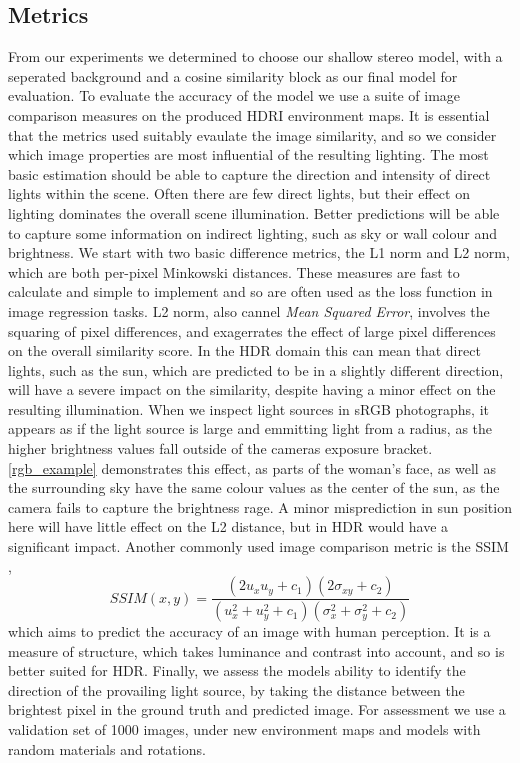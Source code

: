 \documentclass[ %
                    author={Gavin Parker},
                supervisor={Dr. Neill Campbell},
                    degree={MEng},
                     title={Deep Siamese Networks for Illumination Estimation from Stereo Images},
                  subtitle={},
                      type={Research},
                      year={2018} ]{dissertation}
\begin{document}
\subsection{Metrics}
From our experiments we determined to choose our shallow stereo model, with a seperated background and a cosine similarity block as our final model for evaluation. To evaluate the accuracy of the model we use a suite of image comparison measures on the produced HDRI environment maps. It is essential that the metrics used suitably evaulate the image similarity, and so we consider which image properties are most influential of the resulting lighting. The most basic estimation should be able to capture the direction and intensity of direct lights within the scene. Often there are few direct lights, but their effect on lighting dominates the overall scene illumination. Better predictions will be able to capture some information on indirect lighting, such as sky or wall colour and brightness.
\newline 
We start with two basic difference metrics, the L1 norm and L2 norm, which are both per-pixel Minkowski distances. These measures are fast to calculate and simple to implement and so are often used as the loss function in image regression tasks. L2 norm, also cannel \textit{Mean Squared Error}, involves the squaring of pixel differences, and exagerrates the effect of large pixel differences on the overall similarity score. In the HDR domain this can mean that direct lights, such as the sun, which are predicted to be in a slightly different direction, will have a severe impact on the similarity, despite having a minor effect on the resulting illumination. When we inspect light sources in sRGB photographs, it appears as if the light source is large and emmitting light from a radius, as the higher brightness values fall outside of the cameras exposure bracket. \ref{rgb_example} demonstrates this effect, as parts of the woman's face, as well as the surrounding sky have the same colour values as the center of the sun, as the camera fails to capture the brightness rage. A minor misprediction in sun position here will have little effect on the L2 distance, but in HDR would have a significant impact. 
\newline
Another commonly used image comparison metric is the SSIM \cite{1284395},
\[SSIM(x,y) = \frac{(2u_xu_y + c_1)(2\sigma_{xy} + c_2)}{(u^2_x + u^2_y + c_1)(\sigma^2_x + \sigma^2_y + c_2)}\]
which aims to predict the accuracy of an image with human perception. It is a measure of structure, which takes luminance and contrast into account, and so is better suited for HDR. Finally, we assess the models ability to identify the direction of the provailing light source, by taking the distance between the brightest pixel in the ground truth and predicted image. For assessment we use a validation set of 1000 images, under new environment maps and models with random materials and rotations.
\end{document}
